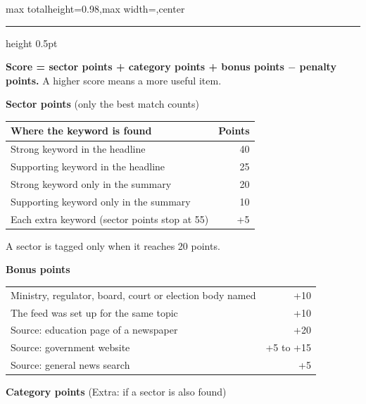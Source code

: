 \documentclass[10pt,a4paper]{article}
\newcommand{\stage}[2]{\vspace{7pt}{\large\bfseries Stage #1.\enspace #2}\par\nobreak\vspace{1pt}%
  \hrule height 0.5pt\nobreak\vspace{3pt}}
\newcommand{\lbl}[1]{\textbf{#1}}
\begin{document}
\noindent
\begin{adjustbox}{max totalheight=0.98\textheight,max width=\textwidth,center}
\begin{minipage}{\textwidth}
\setlength{\parskip}{4pt}

\stage{3}{Scoring (0 to 100)}

\lbl{Score = sector points + category points + bonus points $-$ penalty points.} A higher score means a more useful item.

\vspace{2pt}
\begin{minipage}[t]{0.47\textwidth}
\lbl{Sector points} (only the best match counts)\par\vspace{2pt}
\begin{tabularx}{\linewidth}{@{}Xr@{}}
\toprule
Where the keyword is found & Points\\
\midrule
Strong keyword in the headline & 40\\
Supporting keyword in the headline & 25\\
Strong keyword only in the summary & 20\\
Supporting keyword only in the summary & 10\\
Each extra keyword (sector points stop at 55) & +5\\
\bottomrule
\end{tabularx}\par\vspace{2pt}
A sector is tagged only when it reaches 20 points.\par\vspace{7pt}
\lbl{Bonus points}\par\vspace{2pt}
\begin{tabularx}{\linewidth}{@{}Xr@{}}
\toprule
Ministry, regulator, board, court or election body named & +10\\
The feed was set up for the same topic & +10\\
Source: education page of a newspaper & +20\\
Source: government website & +5 to +15\\
Source: general news search & +5\\
\bottomrule
\end{tabularx}
\end{minipage}\hfill
\begin{minipage}[t]{0.48\textwidth}
\lbl{Category points} (Extra: if a sector is also found)\par\vspace{2pt}

\end{minipage}
\end{minipage}
\end{adjustbox}
\end{document}
